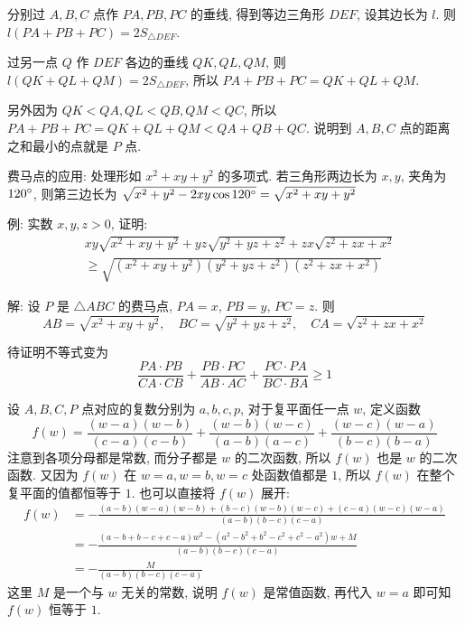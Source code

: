 分别过 $A,B,C$ 点作 $PA, PB, PC$ 的垂线, 得到等边三角形 $DEF$, 设其边长为 $l$. 则 $l(PA+PB+PC) = 2S_{\triangle DEF}$.

过另一点 $Q$ 作 $DEF$ 各边的垂线 $QK, QL, QM$, 则$l(QK+QL+QM) = 2S_{\triangle DEF}$, 所以 $PA+PB+PC = QK+QL+QM$.

另外因为 $QK < QA, QL < QB, QM < QC $, 所以 $PA+PB+PC = QK+QL+QM < QA+QB+QC$. 说明到 $A,B,C$ 点的距离之和最小的点就是 $P$ 点.


\newpage

费马点的应用: 处理形如 $x^2+xy+y^2$ 的多项式. 若三角形两边长为 $x,y$, 夹角为 $120\degree$, 则第三边长为 $\sqrt{x^2+y^2-2xy\cos 120\degree} = \sqrt{x^2+xy+y^2}$

例: 实数 $x,y,z > 0$, 证明:
\begin{align*}
& xy\sqrt{x^2+xy+y^2} + yz\sqrt{y^2+yz+z^2} + zx\sqrt{z^2+zx+x^2} \\
 & \ge \sqrt{(x^2+xy+y^2)(y^2+yz+z^2)(z^2+zx+x^2)}
\end{align*}

解: 设 $P$ 是 $\triangle ABC$ 的费马点, $PA=x$, $PB=y$, $PC=z$. 则
\[ 
AB = \sqrt{x^2+xy+y^2}, \quad
BC = \sqrt{y^2+yz+z^2}, \quad
CA = \sqrt{z^2+zx+x^2}
\]
\begin{figure*}[htbp]
\centering
{}
\end{figure*}

待证明不等式变为
\[\frac{PA\cdot PB}{CA\cdot CB} + \frac{PB\cdot PC}{AB\cdot AC} + \frac{PC\cdot PA}{BC\cdot BA} \ge 1\]

设 $A,B,C,P$ 点对应的复数分别为 $a,b,c,p$, 对于复平面任一点 $w$, 定义函数
\[f(w) = \frac{(w-a)(w-b)}{(c-a)(c-b)} + \frac{(w-b)(w-c)}{(a-b)(a-c)} + \frac{(w-c)(w-a)}{(b-c)(b-a)}\]
注意到各项分母都是常数, 而分子都是 $w$ 的二次函数, 所以 $f(w)$ 也是 $w$ 的二次函数. 又因为 $f(w)$ 在 $w=a, w=b, w=c$ 处函数值都是 $1$, 所以 $f(w)$ 在整个复平面的值都恒等于 $1$. 也可以直接将 $f(w)$ 展开:
\begin{align*}
f(w) &= -\frac{(a-b)(w-a)(w-b)+(b-c)(w-b)(w-c)+(c-a)(w-c)(w-a)}{(a-b)(b-c)(c-a)} \\
&= -\frac{(a-b+b-c+c-a)w^2-(a^2-b^2+b^2-c^2+c^2-a^2)w+M}{(a-b)(b-c)(c-a)} \\
&= -\frac{M}{(a-b)(b-c)(c-a)}
\end{align*}
这里 $M$ 是一个与 $w$ 无关的常数, 说明 $f(w)$ 是常值函数, 再代入 $w=a$ 即可知 $f(w)$ 恒等于 $1$.

